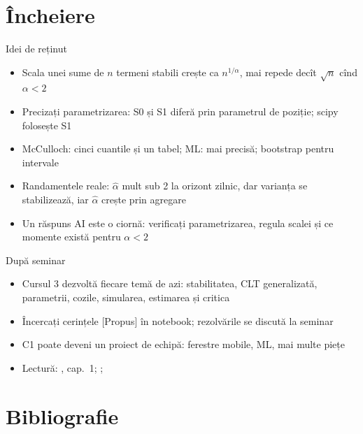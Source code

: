 \section{Încheiere}

\begin{frame}{Idei de reținut}
\itemsize{\small}
\begin{itemize}
    \item Scala unei sume de $n$ termeni stabili crește ca $n^{1/\alpha}$, mai repede decît $\sqrt{n}$ cînd $\alpha < 2$
    \item Precizați parametrizarea: S0 și S1 diferă prin parametrul de poziție; scipy folosește S1
    \item McCulloch: cinci cuantile și un tabel; ML: mai precisă; bootstrap pentru intervale
    \item Randamentele reale: $\hat\alpha$ mult sub 2 la orizont zilnic, dar varianța se stabilizează, iar $\hat\alpha$ crește prin agregare
    \item Un răspuns AI este o ciornă: verificați parametrizarea, regula scalei și ce momente există pentru $\alpha < 2$
\end{itemize}
\end{frame}

\begin{frame}{După seminar}
\itemsize{\small}
\begin{itemize}
    \item Cursul 3 dezvoltă fiecare temă de azi: stabilitatea, CLT generalizată, parametrii, cozile, simularea, estimarea și critica
    \item Încercați cerințele [Propus] în notebook; rezolvările se discută la seminar
    \item C1 poate deveni un proiect de echipă: ferestre mobile, ML, mai multe piețe
    \item Lectură: , cap.~1; ; 
\end{itemize}
\end{frame}


\section{Bibliografie}

